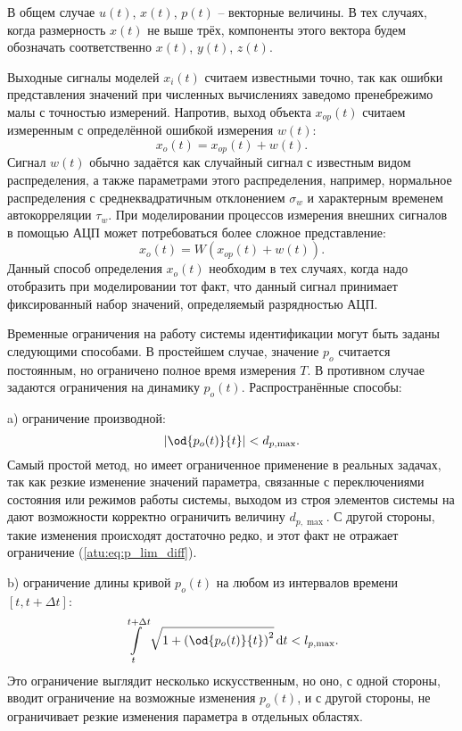 В общем случае $u(t)$, $x(t)$, $p(t)$ -- векторные величины.
В тех случаях, когда размерность $x(t)$ не выше трёх,
компоненты этого вектора будем обозначать соответственно $x(t)$, $y(t)$, $z(t)$.

Выходные сигналы моделей
\label{atu:d:x}$x_i(t)$ считаем известными точно, так как ошибки
представления значений при численных вычислениях заведомо
пренебрежимо малы с точностью измерений. Напротив,
выход объекта $x_{op}(t)$ считаем измеренным
с определённой ошибкой измерения \label{atu:d:w}$w(t)$:
%
\[
  x_o(t) = x_{op}(t) + w(t).
\]
%
Сигнал $w(t)$ обычно задаётся как случайный сигнал с
известным видом распределения, а также параметрами этого распределения,
например, нормальное распределения с среднеквадратичным отклонением $\sigma_w$
и характерным временем автокорреляции $\tau_w$.
При моделировании процессов измерения внешних сигналов в помощью АЦП может потребоваться
более сложное представление:
%
\[
  x_o(t) = W( x_{op}(t) + w(t) ).
\]
%
Данный способ определения $x_o(t)$ необходим в тех случаях,
когда надо отобразить при моделировании тот факт,
что данный сигнал принимает фиксированный набор значений, определяемый разрядностью АЦП.

Временные ограничения на работу системы идентификации могут быть заданы
следующими способами. В простейшем случае, значение $p_o$
считается постоянным, но ограничено полное время измерения $T$.
В противном случае задаются ограничения на динамику $p_o(t)$.
Распространённые способы:

a) ограничение производной:
%
\begin{equation}
  \left| \od{p_o(t)}{t} \right| < d_{p,\max}.
  \label{atu:eq:p_lim_diff}
\end{equation}
Самый простой метод, но имеет ограниченное применение в реальных
задачах, так как резкие изменение значений параметра,
связанные с переключениями состояния или режимов работы системы,
выходом из строя элементов системы на дают возможности корректно ограничить
величину  $d_{p,\max}$. С другой стороны, такие изменения
происходят достаточно редко, и этот факт не отражает ограничение (\ref{atu:eq:p_lim_diff}).

b) ограничение длины кривой $p_o(t)$ на любом из интервалов времени $[t,t+\Delta t]$:
\begin{equation}
  \int\limits_{t}^{t+\Delta t} \sqrt{1 + \left( \od{p_o(t)}{t} \right)^2 } \, \mathrm{d}t < l_{p,\max}.
  \label{atu:eq:p_lim_l}
\end{equation}
%
Это ограничение выглядит несколько искусственным,
но оно, с одной стороны, вводит ограничение на возможные изменения $p_o(t)$,
и с другой стороны, не ограничивает резкие изменения параметра в отдельных областях.

